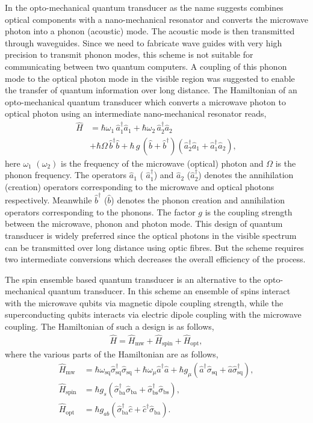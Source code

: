 \documentclass[twocolumn, aps, rmp, amsmath, amssymb, nofootinbib, superscriptaddress, longbibliography, floatfix, table-of-contents, eqsecnum]{revtex4-1}
\begin{document}
In the opto-mechanical quantum transducer as the name suggests combines optical components with a nano-mechanical resonator and converts the microwave photon into a phonon (acoustic) mode. The acoustic mode is then transmitted through waveguides. Since we need to fabricate wave guides with very high precision to transmit phonon modes, this scheme is not suitable for communicating between two quantum computers. A coupling of this phonon mode to the optical photon mode in the visible region was suggested to enable the transfer of quantum information over long distance. The Hamiltonian of an opto-mechanical quantum transducer which converts a microwave photon to optical photon using an intermediate nano-mechanical resonator reads,
\begin{align}
\hat{H} &= \hbar \omega_{1} \, \hat{a}_{1}^{\dag} \hat{a}_{1} + \hbar \omega_{2} \, \hat{a}_{2}^{\dag} \hat{a}_{2} \nonumber\\
&+ \hbar \Omega \, \hat{b}^{\dag} \hat{b} + \hbar \, g \, (\hat{b}+\hat{b}^{\dag}) (\hat{a}_{2}^{\dag} \hat{a}_{1} + \hat{a}_{1}^{\dag} \hat{a}_{2}),
\end{align}
here $\omega_{1}$ $(\omega_{2})$ is the frequency of the microwave (optical) photon and $\Omega$ is the phonon frequency. The operators $\hat{a}_{1}$ ( $\hat{a}_{1}^{\dag}$) and $\hat{a}_{2}$ ($\hat{a}_{2}^{\dag}$) denotes the annihilation (creation) operators corresponding to the microwave and optical photons respectively. Meanwhile $\hat{b}^{\dag}$ ($\hat{b}$) denotes the phonon creation and annihilation operators corresponding to the phonons. The factor $g$ is the coupling strength between the microwave, phonon and photon mode. This design of quantum transducer is widely preferred since the optical photons in the visible spectrum can be transmitted over long distance using optic fibres. But the scheme requires two intermediate conversions which decreases the overall efficiency of the process.

The spin ensemble based quantum transducer is an alternative to the opto-mechanical quantum transducer. In this scheme an ensemble of spins interact with the microwave qubits via magnetic dipole coupling strength, while the superconducting qubits interacts via electric dipole coupling with the microwave coupling. The Hamiltonian of such a design is as follows,
\begin{align}
\hat{H} = \hat{H}_{\mathrm{mw}} + \hat{H}_{\mathrm{spin}} + \hat{H}_{\mathrm{opt}},
\end{align}
where the various parts of the Hamiltonian are as follows,
\begin{align}
\hat{H}_{\mathrm{mw}} &= \hbar \omega_\mathrm{sq} \hat\sigma_\mathrm{sq}^{\dag} \hat\sigma_\mathrm{sq} + \hbar \omega_{\mu} \hat{a}^{\dag} \hat{a} + \hbar g_{\mu} (\hat{a}^{\dag} \hat\sigma_\mathrm{sq} + \hat{a} \hat\sigma_\mathrm{sq}^{\dag}),\nonumber \\
\hat{H}_{\mathrm{spin}} &= \hbar g_{s} (\hat\sigma_\mathrm{ba}^{\dag} \hat\sigma_\mathrm{ba} + \hat\sigma_\mathrm{bs}^{\dag} \hat\sigma_\mathrm{bs}), \nonumber\\
\hat{H}_{\mathrm{opt}} &= \hbar g_{ab} (\hat\sigma_\mathrm{ba}^{\dag} \hat{c} + \hat{c}^{\dag} \hat\sigma_\mathrm{ba}).
\end{align}
\end{document}

